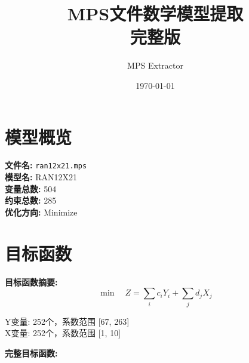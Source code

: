 \documentclass[a4paper,10pt]{article}
\title{MPS文件数学模型提取\\{\large 完整版}}
\author{MPS Extractor}
\date{\today}
\begin{document}
\maketitle
\tableofcontents
\newpage

\section{模型概览}

\textbf{文件名:} \texttt{ran12x21.mps} \\
\textbf{模型名:} RAN12X21 \\
\textbf{变量总数:} 504 \\
\textbf{约束总数:} 285 \\
\textbf{优化方向:} Minimize \\

\section{目标函数}

\textbf{目标函数摘要:}
\begin{equation}
\min \quad Z = \sum_{i} c_i Y_i + \sum_{j} d_j X_j
\end{equation}

Y变量: 252个，系数范围 [67, 263] \\
X变量: 252个，系数范围 [1, 10]

\textbf{完整目标函数:}
\end{document}
